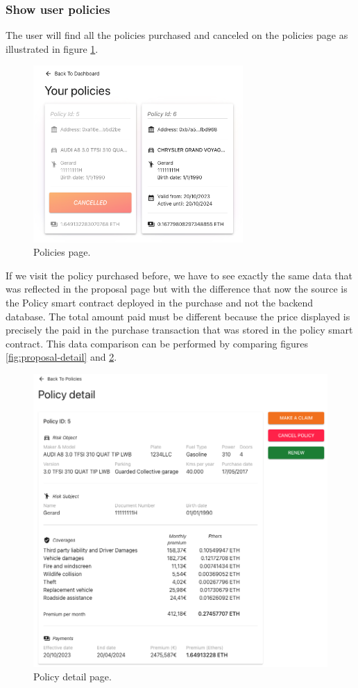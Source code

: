 \subsubsection{Show user policies}
{
The user will find all the policies purchased and canceled on the policies page as illustrated in figure \ref{fig:policies-page}.

\begin{figure}[H]
\centering
\includegraphics[width=8cm]{img/results/policies-page.png}
\caption[Insurechain: Policies page]{\footnotesize{Policies page.}}
\label{fig:policies-page}
\end{figure}

If we visit the policy purchased before, we have to see exactly the same data that was reflected in the proposal page but with the difference that now the source is the Policy smart contract deployed in the purchase and not the backend database. The total amount paid must be different because the price displayed is precisely the paid in the purchase transaction that was stored in the policy smart contract. This data comparison can be performed by comparing figures \ref{fig:proposal-detail} and \ref{fig:policy-detail}.

\begin{figure}[H]
\centering
\includegraphics[width=12cm]{img/results/policy-detail.png}
\caption[Insurechain: Policy detail page]{\footnotesize{Policy detail page.}}
\label{fig:policy-detail}
\end{figure}

}

